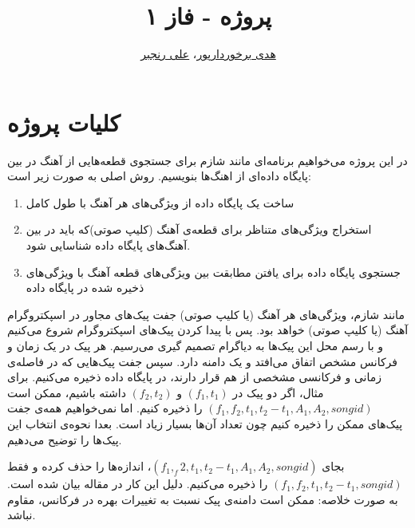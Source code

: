 \documentclass{utsignal}
\title{پروژه - فاز ۱}
\author{\href{mailto:h.barkhordarpour@ut.ac.ir?subject=[SS\%20S98 A2]}{هدی برخوردارپور}، 
\href{mailto:ranjbar.ali@ut.ac.ir?subject=[SS\%20S98 A2]\%20}{علی رنجبر}}
\begin{document}
	\maketitle
	\section*{کلیات پروژه}
	در این پروژه می‌خواهیم برنامه‌ای مانند شازم برای جستجوی قطعه‌هایی از آهنگ در بین پایگاه داده‌ای از اهنگ‌ها بنویسیم. روش اصلی به صورت زیر است:
	\begin{enumerate}
		\item ساخت یک پایگاه داده از ویژگی‌های هر آهنگ با طول کامل
		\item استخراج ویژگی‌های متناظر برای قطعه‌ی آهنگ  (کلیپ صوتی)که باید در بین آهنگ‌های پایگاه داده شناسایی شود.
		\item جستجوی پایگاه داده برای یافتن مطابقت بین ویژگی‌‌های قطعه آهنگ با ویژگی‌های ذخیره شده در پایگاه داده
	\end{enumerate}
	مانند شازم، ویژگی‌های هر آهنگ (یا کلیپ صوتی) جفت پیک‌های مجاور در اسپکتروگرام آهنگ (یا کلیپ صوتی) خواهد بود. پس با پیدا کردن پیک‌های اسپکتروگرام شروع می‌کنیم و با رسم محل این پیک‌ها به دیاگرام تصمیم گیری  می‌رسیم. هر پیک در یک زمان و فرکانس مشخص	  اتفاق می‌افتد و یک دامنه  دارد. سپس جفت پیک‌هایی که در فاصله‌ی زمانی و فرکانسی مشخصی از هم قرار دارند، در پایگاه داده ذخیره می‌کنیم. برای مثال، اگر دو پیک در $(f_1, t_1)$ و $(f_2, t_2)$ داشته باشیم، ممکن است $(f_1, f_2, t_1, t_2-t_1,A_1,A_2,songid)$ را ذخیره کنیم. اما نمی‌خواهیم همه‌ی جفت پیک‌های ممکن را ذخیره کنیم چون تعداد آن‌ها بسیار زیاد است. بعدا نحوه‌ی انتخاب این پیک‌ها را توضیح می‌دهیم.
	
	بجای $(f_1, _f2, t_1, t_2-t_1,A_1,A_2,songid)$، اندازه‌ها را حذف کرده و فقط $(f_1, f_2, t_1, t_2-t_1,songid)$ را ذخیره می‌کنیم. دلیل این کار در مقاله بیان شده است. به صورت خلاصه: ممکن است دامنه‌ی پیک نسبت به تغییرات بهره در فرکانس، مقاوم نباشد.
	
\end{document}
